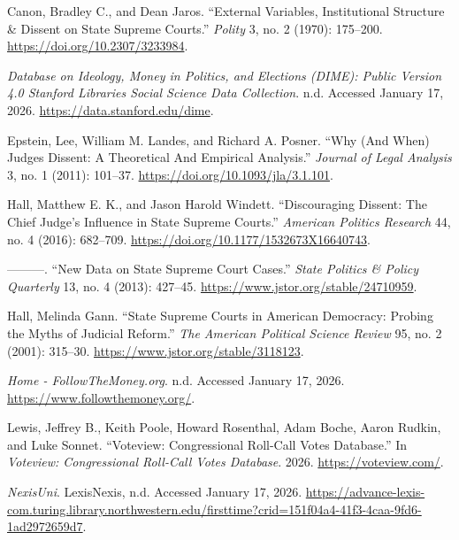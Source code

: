 \begin{CSLReferences}{1}{1}
Canon, Bradley C., and Dean Jaros. {``External {Variables},
{Institutional Structure} \& {Dissent} on {State Supreme Courts}.''}
\emph{Polity} 3, no. 2 (1970): 175--200.
\url{https://doi.org/10.2307/3233984}.

\emph{Database on {Ideology}, {Money} in {Politics}, and {Elections}
({DIME}): {Public} Version 4.0 \textbar{} {Stanford Libraries Social
Science Data Collection}}. n.d. Accessed January 17, 2026.
\url{https://data.stanford.edu/dime}.

Epstein, Lee, William M. Landes, and Richard A. Posner. {``Why ({And
When}) {Judges Dissent}: {A Theoretical And Empirical Analysis}.''}
\emph{Journal of Legal Analysis} 3, no. 1 (2011): 101--37.
\url{https://doi.org/10.1093/jla/3.1.101}.

Hall, Matthew E. K., and Jason Harold Windett. {``Discouraging
{Dissent}: {The Chief Judge}'s {Influence} in {State Supreme Courts}.''}
\emph{American Politics Research} 44, no. 4 (2016): 682--709.
\url{https://doi.org/10.1177/1532673X16640743}.

---------. {``New {Data} on {State Supreme Court Cases}.''} \emph{State
Politics \& Policy Quarterly} 13, no. 4 (2013): 427--45.
\url{https://www.jstor.org/stable/24710959}.

Hall, Melinda Gann. {``State {Supreme Courts} in {American Democracy}:
{Probing} the {Myths} of {Judicial Reform}.''} \emph{The American
Political Science Review} 95, no. 2 (2001): 315--30.
\url{https://www.jstor.org/stable/3118123}.

\emph{Home - {FollowTheMoney}.org}. n.d. Accessed January 17, 2026.
\url{https://www.followthemoney.org/}.

Lewis, Jeffrey B., Keith Poole, Howard Rosenthal, Adam Boche, Aaron
Rudkin, and Luke Sonnet. {``Voteview: {Congressional Roll-Call Votes
Database}.''} In \emph{Voteview: Congressional Roll-Call Votes
Database}. 2026. \url{https://voteview.com/}.

\emph{{NexisUni}}. LexisNexis, n.d. Accessed January 17, 2026.
\url{https://advance-lexis-com.turing.library.northwestern.edu/firsttime?crid=151f04a4-41f3-4caa-9fd6-1ad2972659d7}.


\end{CSLReferences}
